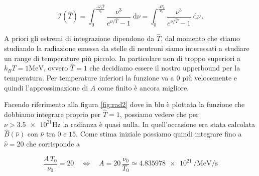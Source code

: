 \documentclass[a4paper, titlepage]{article}
\begin{document}
\begin{equation}
    \mathcal{I} (\hat T) = \int_0^{\frac{A T_0 \hat T}{\nu_0}} \frac{\nu^3}{e^{\nu / \hat T} - 1} \; \mathrm{d} \nu 
    = \int_0^{\frac{A T_0}{\nu_0}} \frac{\nu^3}{e^{\nu / \hat T} - 1} \; \mathrm{d} \nu \, .
    \label{eq:integrale}
\end{equation}

A priori gli estremi di integrazione dipendono da $\hat T$, dal momento che stiamo studiando la radiazione emessa da stelle di neutroni siamo interessati a studiare un range di temperature più piccolo.
In particolare non di troppo superiori a $k_B T = 1 \unit{\mega\electronvolt}$, ovvero $\hat T = 1$ che decidiamo essere il nostro upperbound per la temperatura.
Per temperature inferiori la funzione va a 0 più velocemente e quindi l'approssimazione di $A$ come finito è ancora migliore.

Facendo riferimento alla figura \ref{fig:rad2} dove in blu è plottata la funzione che dobbiamo integrare proprio per $\hat T = 1$, possiamo vedere che per $\nu > \num{3.5e21} \unit{\hertz}$ la radianza è quasi nulla.
In quell'occasione era stata calcolata $\hat B(\hat \nu)$ con $\hat \nu$ tra $0$ e $15$. Come stima iniziale possiamo quindi integrare fino a $\hat \nu = 20$ che corrisponde a

\begin{equation}
    \frac{A \, T_0}{\nu_0} = 20
    \quad \iff \quad
    A = 20 \, \frac{\nu_0}{T_0} \simeq \num{4.835978e21} \, \unit{\per\mega\electronvolt\per\second}
    \label{eq:A}
\end{equation}
\end{document}
